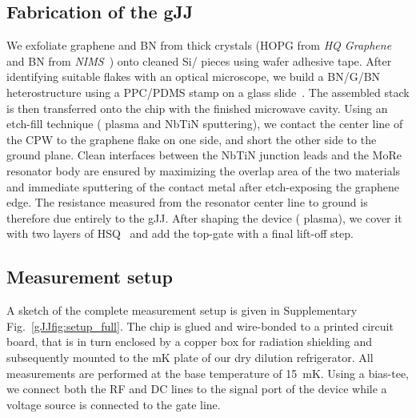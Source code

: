 \subsection{Fabrication of the gJJ}
We exfoliate graphene and BN from thick crystals (HOPG from \textit{HQ Graphene} and BN from \textit{NIMS}~\cite{taniguchiSynthesisHighpurityBoron2007}) onto cleaned Si/ pieces using wafer adhesive tape.
After identifying suitable flakes with an optical microscope, we build a BN/G/BN heterostructure using a PPC/PDMS stamp on a glass slide~\cite{pizzoccheroHotPickupTechnique2016a,wangOneDimensionalElectricalContact2013b}.
The assembled stack is then transferred onto the chip with the finished microwave cavity.
Using an etch-fill technique ( plasma and NbTiN sputtering), we contact the center line of the CPW to the graphene flake on one side, and short the other side to the ground plane.
Clean interfaces between the NbTiN junction leads and the MoRe resonator body are ensured by maximizing the overlap area of the two materials and immediate sputtering of the contact metal after etch-exposing the graphene edge.
The resistance measured from the resonator center line to ground is therefore due entirely to the gJJ.
After shaping the device ( plasma), we cover it with two layers of HSQ~\cite{nandaCurrentPhaseRelationBallistic2017} and add the top-gate with a final lift-off step.

\subsection{Measurement setup}\label{sec:setup}
\noindent A sketch of the complete measurement setup is given in Supplementary Fig.~\ref{gJJfig:setup_full}.
The chip is glued and wire-bonded to a printed circuit board, that is in turn enclosed by a copper box for radiation shielding and subsequently mounted to the mK plate of our dry dilution refrigerator.
All measurements are performed at the base temperature of \SI{15}{mK}.
Using a bias-tee, we connect both the RF and DC lines to the signal port of the device while a voltage source is connected to the gate line.


